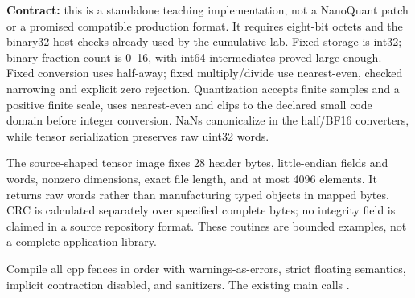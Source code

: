 \textbf{Contract:} this is a standalone teaching implementation, not a NanoQuant patch or a promised compatible production format. It requires eight-bit octets and the binary32 host checks already used by the cumulative lab. Fixed storage is int32; binary fraction count is 0--16, with int64 intermediates proved large enough. Fixed conversion uses half-away; fixed multiply/divide use nearest-even, checked narrowing and explicit zero rejection. Quantization accepts finite samples and a positive finite scale, uses nearest-even and clips to the declared small code domain before integer conversion. NaNs canonicalize in the half/BF16 converters, while tensor serialization preserves raw uint32 words.

The source-shaped tensor image fixes 28 header bytes, little-endian fields and words, nonzero dimensions, exact file length, and at most 4096 elements. It returns raw words rather than manufacturing typed objects in mapped bytes. CRC is calculated separately over specified complete bytes; no integrity field is claimed in a source repository format. These routines are bounded examples, not a complete application library.

Compile all cpp fences in order with warnings-as-errors, strict floating semantics, implicit contraction disabled, and sanitizers. The existing main calls .

